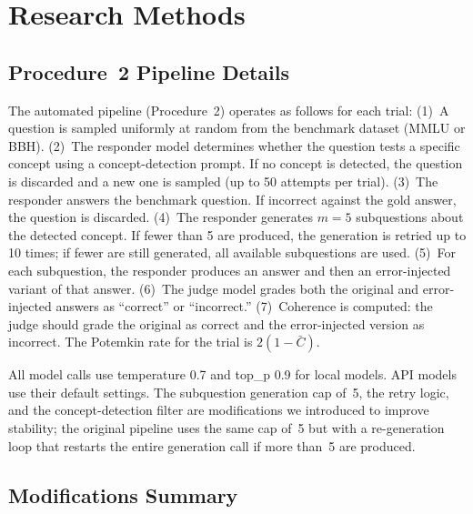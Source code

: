 \documentclass[sigconf,authordraft]{acmart}
\begin{document}
\appendix

\section{Research Methods}

\subsection{Procedure~2 Pipeline Details}

The automated pipeline (Procedure~2) operates as follows for each trial: (1)~A question is sampled uniformly at random from the benchmark dataset (MMLU or BBH). (2)~The responder model determines whether the question tests a specific concept using a concept-detection prompt. If no concept is detected, the question is discarded and a new one is sampled (up to 50 attempts per trial). (3)~The responder answers the benchmark question. If incorrect against the gold answer, the question is discarded. (4)~The responder generates $m{=}5$ subquestions about the detected concept. If fewer than 5 are produced, the generation is retried up to 10 times; if fewer are still generated, all available subquestions are used. (5)~For each subquestion, the responder produces an answer and then an error-injected variant of that answer. (6)~The judge model grades both the original and error-injected answers as ``correct'' or ``incorrect.'' (7)~Coherence is computed: the judge should grade the original as correct and the error-injected version as incorrect. The Potemkin rate for the trial is $2(1 - \bar{C})$.

All model calls use temperature 0.7 and top\_p 0.9 for local models. API models use their default settings. The subquestion generation cap of~5, the retry logic, and the concept-detection filter are modifications we introduced to improve stability; the original pipeline uses the same cap of~5 but with a re-generation loop that restarts the entire generation call if more than~5 are produced.

\subsection{Modifications Summary}
\end{document}
